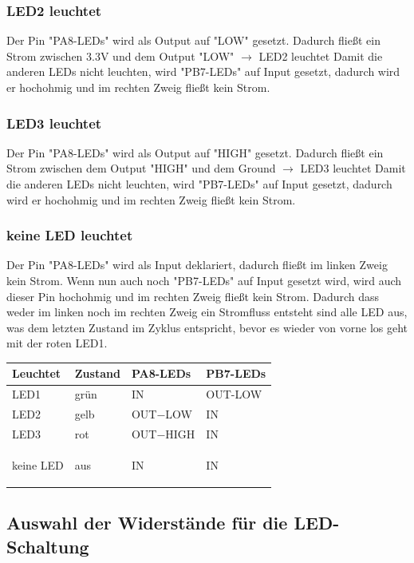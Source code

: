 \documentclass[a4paper,
DIV=13,
12pt,
BCOR=10mm,
department=FakEI,
parskip=half,
automark,
]{article}
\begin{document}
\subsubsection{LED2 leuchtet}
Der Pin "PA8-LEDs" wird als Output auf "LOW" gesetzt. Dadurch fließt ein Strom zwischen 3.3V und dem Output "LOW" $\rightarrow$ LED2 leuchtet Damit die anderen LEDs nicht leuchten, wird "PB7-LEDs" auf Input gesetzt, dadurch wird er hochohmig und im rechten Zweig fließt kein Strom.
\subsubsection{LED3 leuchtet}
Der Pin "PA8-LEDs" wird als Output auf "HIGH" gesetzt. Dadurch fließt ein Strom zwischen dem Output "HIGH" und dem Ground $\rightarrow$ LED3 leuchtet Damit die anderen LEDs nicht leuchten, wird "PB7-LEDs" auf Input gesetzt, dadurch wird er hochohmig und im rechten Zweig fließt kein Strom.

\subsubsection{keine LED leuchtet}
Der Pin "PA8-LEDs" wird als Input deklariert, dadurch fließt im linken Zweig kein Strom. Wenn nun auch noch "PB7-LEDs" auf Input gesetzt wird, wird auch dieser Pin hochohmig und im rechten Zweig fließt kein Strom. Dadurch dass weder im linken noch im rechten Zweig ein Stromfluss entsteht sind alle LED aus, was dem letzten Zustand im Zyklus entspricht, bevor es wieder von vorne los geht mit der roten LED1.

\begin{center}
\begin{tabularx}{\columnwidth}{XXXl}
Leuchtet &Zustand &PA8-LEDs &PB7-LEDs \\ \hline
LED1 & grün & IN &OUT-LOW\\
LED2 & gelb & OUT$-$LOW &IN\\
LED3 & rot & OUT$-$HIGH & IN\\
keine LED & aus & IN & IN
 
\label{tab:ZusammenfassungderFunktionsweisederLEDSchaltung}
\end{tabularx}
\end{center}

\subsection{Auswahl der Widerstände für die LED-Schaltung}
\end{document}
